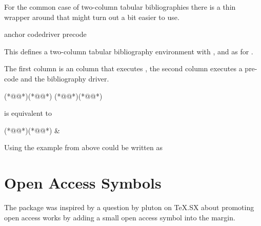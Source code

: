 \documentclass[DIV=9]{scrartcl}
\begin{document}
For the common case of two-column tabular bibliographies there is a thin
wrapper around  that might turn out a bit easier to use.
\begin{ltxsyntax}
  {anchor code}{driver precode}

  This defines a two-column tabular bibliography environment with ,
   and  as for .

  The first column is an  column that executes
  , the second column executes a pre-code and
  the bibliography driver.

\begin{biblatexcode}
  {(*@@*)}{(*@@*)}
  {(*@@*)}{(*@@*)}
\end{biblatexcode}
is equivalent to
\begin{biblatexcode}
  {(*@@*)}{(*@@*)}
  { &  \\}
\end{biblatexcode}

Using  the example from above could be written as
\end{ltxsyntax}

\clearpage
\section{Open Access Symbols}\label{sec:oa}
\label{exltd@itm@biblatex-ext-oa}
The package  was inspired by a question%
by pluton on TeX.SX
about promoting open access works by adding a small open access symbol into
the margin.
\end{document}
